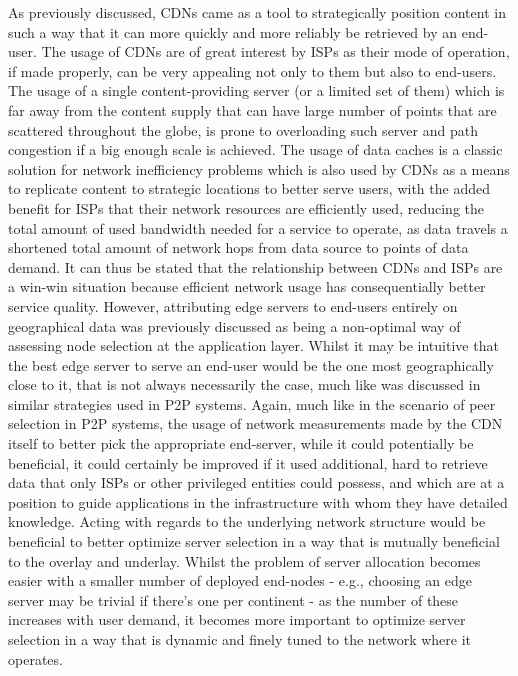 \documentclass[
  oneside,
  11pt, a4paper,
  footinclude=true,
  headinclude=true,
  cleardoublepage=empty
]{scrbook}
\begin{document}
	As previously discussed, CDNs came as a tool to strategically position content in such a way that it can more quickly and more reliably be retrieved by an end-user. The usage of CDNs are of great interest by ISPs as their mode of operation, if made properly, can be very appealing not only to them but also to end-users. The usage of a single content-providing server (or a limited set of them) which is far away from the content supply that can have large number of points that are scattered throughout the globe, is prone to overloading such server and path congestion if a big enough scale is achieved. The usage of data caches is a classic solution for network inefficiency problems which is also used by CDNs as a means to replicate content to strategic locations to better serve users, with the added benefit for ISPs that their network resources are efficiently used, reducing the total amount of used bandwidth needed for a service to operate, as data travels a shortened total amount of network hops from data source to points of data demand. It can thus be stated that the relationship between CDNs and ISPs are a win-win situation because efficient network usage has consequentially better service quality. However, attributing edge servers to end-users entirely on geographical data was previously discussed as being a non-optimal way of assessing node selection at the application layer. Whilst it may be intuitive that the best edge server to serve an end-user would be the one most geographically close to it, that is not always necessarily the case, much like was discussed in similar strategies used in P2P systems. Again, much like in the scenario of peer selection in P2P systems, the usage of network measurements made by the CDN itself to better pick the appropriate end-server, while it could potentially be beneficial, it could certainly be improved if it used additional, hard to retrieve data that only ISPs or other privileged entities could possess, and which are at a position to guide applications in the infrastructure with whom they have detailed knowledge. Acting with regards to the underlying network structure would be beneficial to better optimize server selection in a way that is mutually beneficial to the overlay and underlay. Whilst the problem of server allocation becomes easier with a smaller number of deployed end-nodes - e.g., choosing an edge server may be trivial if there's one per continent - as the number of these increases with user demand, it becomes more important to optimize server selection in a way that is dynamic and finely tuned to the network where it operates.
	
\end{document}
